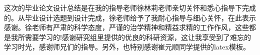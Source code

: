 \begin{thanksfor}
    这次的毕业论文设计总结是在我的指导老师徐林莉老师亲切关怀和悉心指导下完成的。从毕业设计选题到设计完成，徐老师给予了我耐心指导与细心关怀，在此表示感谢。徐老师有严肃的科学态度，严谨的治学精神和精益求精的工作作风，这些都是我所需要学习的!感谢研究组里提供的优良的科研资源，这让我享受到了难忘的学习时光，感谢师兄们的指导。另外，也特别感谢崔元顺同学提供的latex模板。
\end{thanksfor} 